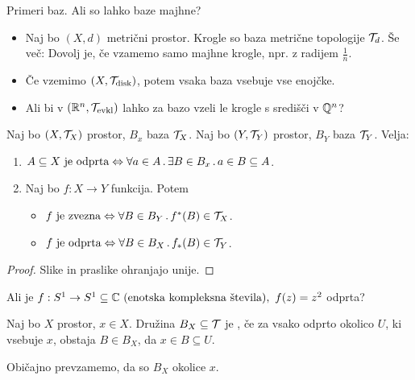 \begin{primer}
    Primeri baz. Ali so lahko baze majhne?
    \begin{itemize}
        \item Naj bo $(X, d)$ metrični prostor. Krogle so baza metrične topologije $\mathcal{T}_d$. Še več: Dovolj je, če vzamemo samo majhne krogle, npr. z radijem $\frac{1}{n}$.
        \item Če vzemimo $(X, \mathcal{T}_\text{disk})$, potem vsaka baza vsebuje vse enojčke.
        \item Ali bi v $(\mathbb{R}^n, \mathcal{T}_\text{evkl})$ lahko za bazo vzeli le krogle s središči v $\mathbb{Q}^n$?
    \end{itemize}
\end{primer}

\begin{trditev}
    Naj bo $(X, \mathcal{T}_X)$ prostor, $B_x$ baza $\mathcal{T}_X$. Naj bo $(Y, \mathcal{T}_Y)$ prostor, $B_Y$ baza $\mathcal{T}_Y$. Velja:
    \begin{enumerate}
        \item $A \subseteq X \text{ je odprta} \Leftrightarrow \forall a \in A \,.\, \exists B \in B_x \,.\, a \in B \subseteq A$.
        \item Naj bo $f: X \to Y$ funkcija. Potem
        \begin{itemize}
            \item $f \text{ je zvezna} \Leftrightarrow \forall B \in B_Y \,.\, f^{*}(B) \in \mathcal{T}_X$.
            \item $f \text{ je odprta} \Leftrightarrow \forall B \in B_X \,.\, f_{*}(B) \in \mathcal{T}_Y$.
        \end{itemize}
    \end{enumerate}
\end{trditev}

\begin{proof}
    Slike in praslike ohranjajo unije.
\end{proof}

\begin{primer}
    Ali je $f: S^1 \to S^1 \subseteq \mathbb{C} \text{ (enotska kompleksna števila)}, \ f(z) = z^2$ odprta?
\end{primer}

\begin{definicija}
    Naj bo $X$ prostor, $x \in X$. Družina $B_X \subseteq \mathcal{T}$ je , če za vsako odprto okolico $U$, ki vsebuje $x$, obstaja $B \in B_X$, da $x \in B \subseteq U$. 
\end{definicija}

\begin{opomba}
    Običajno prevzamemo, da so $B_X$ okolice $x$.
\end{opomba}

